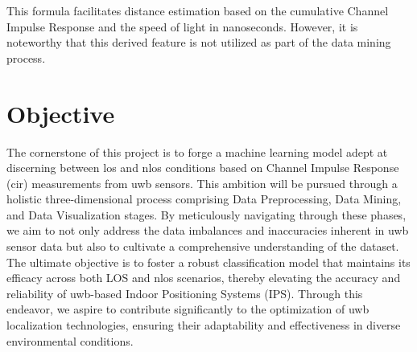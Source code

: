 This formula facilitates distance estimation based on the cumulative Channel Impulse Response and the speed of light in nanoseconds. However, it is noteworthy that this derived feature is not utilized as part of the data mining process.


\section{Objective}\label{objective}
The cornerstone of this project is to forge a machine learning model adept at discerning between \gls{los} and \gls{nlos} conditions based on Channel Impulse Response (\gls{cir}) measurements from \gls{uwb} sensors. This ambition will be pursued through a holistic three-dimensional process comprising Data Preprocessing, Data Mining, and Data Visualization stages. By meticulously navigating through these phases, we aim to not only address the data imbalances and inaccuracies inherent in \gls{uwb} sensor data but also to cultivate a comprehensive understanding of the dataset. The ultimate objective is to foster a robust classification model that maintains its efficacy across both LOS and \gls{nlos} scenarios, thereby elevating the accuracy and reliability of \gls{uwb}-based Indoor Positioning Systems (IPS). Through this endeavor, we aspire to contribute significantly to the optimization of \gls{uwb} localization technologies, ensuring their adaptability and effectiveness in diverse environmental conditions.




